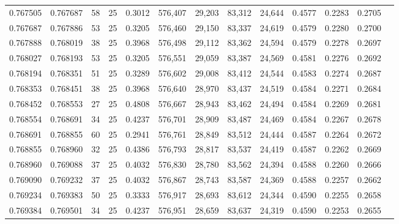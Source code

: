 \begin{tabular}{rrrrrrrrrrrrr}
0.767505 & 0.767687 &    58 &  25 &                                     0.3012 & 576,407 &  29,203 &  83,312 &  24,644 & 0.4577 & 0.2283 & 0.2705 \\
0.767687 & 0.767886 &    53 &  25 &                                     0.3205 & 576,460 &  29,150 &  83,337 &  24,619 & 0.4579 & 0.2280 & 0.2700 \\
0.767888 & 0.768019 &    38 &  25 &                                     0.3968 & 576,498 &  29,112 &  83,362 &  24,594 & 0.4579 & 0.2278 & 0.2697 \\
0.768027 & 0.768193 &    53 &  25 &                                     0.3205 & 576,551 &  29,059 &  83,387 &  24,569 & 0.4581 & 0.2276 & 0.2692 \\
0.768194 & 0.768351 &    51 &  25 &                                     0.3289 & 576,602 &  29,008 &  83,412 &  24,544 & 0.4583 & 0.2274 & 0.2687 \\
0.768353 & 0.768451 &    38 &  25 &                                     0.3968 & 576,640 &  28,970 &  83,437 &  24,519 & 0.4584 & 0.2271 & 0.2684 \\
0.768452 & 0.768553 &    27 &  25 &                                     0.4808 & 576,667 &  28,943 &  83,462 &  24,494 & 0.4584 & 0.2269 & 0.2681 \\
0.768554 & 0.768691 &    34 &  25 &                                     0.4237 & 576,701 &  28,909 &  83,487 &  24,469 & 0.4584 & 0.2267 & 0.2678 \\
0.768691 & 0.768855 &    60 &  25 &                                     0.2941 & 576,761 &  28,849 &  83,512 &  24,444 & 0.4587 & 0.2264 & 0.2672 \\
0.768855 & 0.768960 &    32 &  25 &                                     0.4386 & 576,793 &  28,817 &  83,537 &  24,419 & 0.4587 & 0.2262 & 0.2669 \\
0.768960 & 0.769088 &    37 &  25 &                                     0.4032 & 576,830 &  28,780 &  83,562 &  24,394 & 0.4588 & 0.2260 & 0.2666 \\
0.769090 & 0.769232 &    37 &  25 &                                     0.4032 & 576,867 &  28,743 &  83,587 &  24,369 & 0.4588 & 0.2257 & 0.2662 \\
0.769234 & 0.769383 &    50 &  25 &                                     0.3333 & 576,917 &  28,693 &  83,612 &  24,344 & 0.4590 & 0.2255 & 0.2658 \\
0.769384 & 0.769501 &    34 &  25 &                                     0.4237 & 576,951 &  28,659 &  83,637 &  24,319 & 0.4590 & 0.2253 & 0.2655 \\

\end{tabular}
